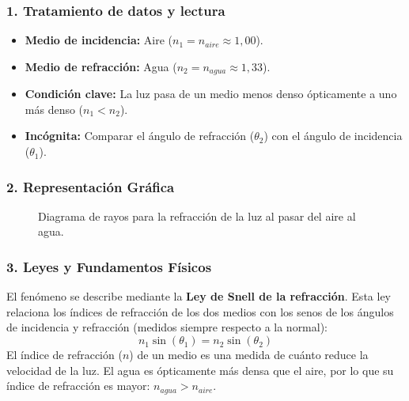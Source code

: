 \subsubsection*{1. Tratamiento de datos y lectura}
\begin{itemize}
    \item \textbf{Medio de incidencia:} Aire ($n_1 = n_{aire} \approx 1,00$).
    \item \textbf{Medio de refracción:} Agua ($n_2 = n_{agua} \approx 1,33$).
    \item \textbf{Condición clave:} La luz pasa de un medio menos denso ópticamente a uno más denso ($n_1 < n_2$).
    \item \textbf{Incógnita:} Comparar el ángulo de refracción ($\theta_2$) con el ángulo de incidencia ($\theta_1$).
\end{itemize}

\subsubsection*{2. Representación Gráfica}
\begin{figure}[H]
    \centering
    \caption{Diagrama de rayos para la refracción de la luz al pasar del aire al agua.}
\end{figure}

\subsubsection*{3. Leyes y Fundamentos Físicos}
El fenómeno se describe mediante la \textbf{Ley de Snell de la refracción}. Esta ley relaciona los índices de refracción de los dos medios con los senos de los ángulos de incidencia y refracción (medidos siempre respecto a la normal):
$$ n_1 \sin(\theta_1) = n_2 \sin(\theta_2) $$
El índice de refracción ($n$) de un medio es una medida de cuánto reduce la velocidad de la luz. El agua es ópticamente más densa que el aire, por lo que su índice de refracción es mayor: $n_{agua} > n_{aire}$.

